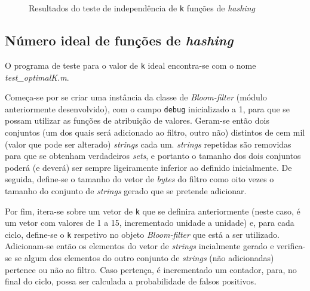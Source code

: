\documentclass[a4paper,11pt,openright,oneside]{report}
\begin{document}
\begin{figure}[ht]
\center
{}
\caption{Resultados do teste de independência de \texttt{k} funções de \textit{hashing}}
\label{fig:hashindep}
\end{figure}

\subsection{Número ideal de funções de \textit{hashing}}
\label{subsec.optimalk}

O programa de teste para o valor de \texttt{k} ideal encontra-se com o nome \textit{test\_optimalK.m}.

Começa-se por se criar uma instância da classe de \textit{Bloom-filter} (módulo anteriormente desenvolvido), com o campo \texttt{debug} inicializado a 1, para que se possam utilizar as funções de atribuição de valores. Geram-se então dois conjuntos (um dos quais será adicionado ao filtro, outro não) distintos de cem mil (valor que pode ser alterado) \textit{strings} cada um. \textit{strings} repetidas são removidas para que se obtenham verdadeiros \textit{sets}, e portanto o tamanho dos dois conjuntos poderá (e deverá) ser sempre ligeiramente inferior ao definido inicialmente. De seguida, define-se o tamanho do vetor de \textit{bytes} do filtro como oito vezes o tamanho do conjunto de \textit{strings} gerado que se pretende adicionar.

Por fim, itera-se sobre um vetor de \texttt{k} que se definira anteriormente (neste caso, é um vetor com valores de 1 a 15, incrementado unidade a unidade) e, para cada ciclo, define-se o \texttt{k} respetivo no objeto \textit{Bloom-filter} que está a ser utilizado. Adicionam-se então os elementos do vetor de \textit{strings} incialmente gerado e verifica-se se algum dos elementos do outro conjunto de \textit{strings} (não adicionadas) pertence ou não ao filtro. Caso pertença, é incrementado um contador, para, no final do ciclo, possa ser calculada a probabilidade de falsos positivos.
\end{document}
